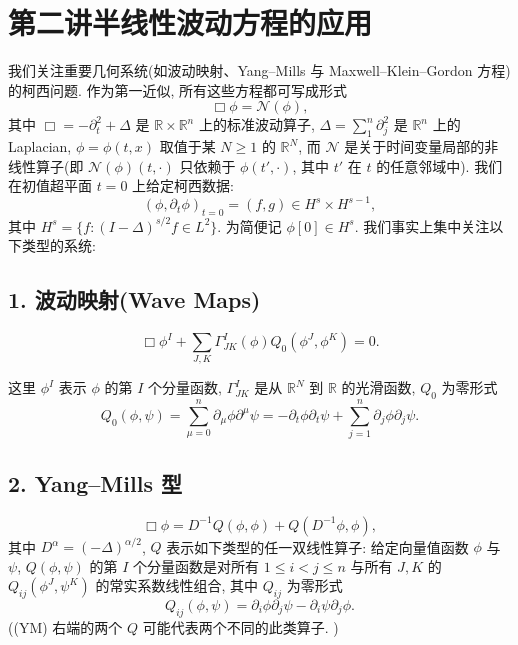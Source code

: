 \chapter{第二讲\quad 半线性波动方程的应用}

我们关注重要几何系统(如波动映射、Yang--Mills 与 Maxwell--Klein--Gordon 方程)的柯西问题. 作为第一近似, 所有这些方程都可写成形式
\begin{equation}
\Box\phi=\mathcal{N}(\phi),\end{equation}
其中 $\Box = -\partial_t^2 + \Delta$ 是 $\mathbb{R} \times \mathbb{R}^n$ 上的标准波动算子, $\Delta = \sum_1^n \partial_j^2$ 是 $\mathbb{R}^n$ 上的 Laplacian, $\phi = \phi(t, x)$ 取值于某 $N \geq 1$ 的 $\mathbb{R}^N$, 而 $\mathcal{N}$ 是关于时间变量局部的非线性算子(即 $\mathcal{N}(\phi)(t, \cdot)$ 只依赖于 $\phi(t', \cdot)$, 其中 $t'$ 在 $t$ 的任意邻域中).
我们在初值超平面 $t = 0$ 上给定柯西数据:
\begin{equation}
(\phi,\partial_{t}\phi)_{t=0}=(f,g)\in H^{s}\times H^{s-1},\end{equation}
其中 $H^s = \{f : (I - \Delta)^{s/2} f \in L^2\}$. 为简便记 $\phi[0] \in H^s$.
我们事实上集中关注以下类型的系统:
\section*{1. 波动映射(Wave Maps)}

\begin{equation}
\Box\phi^{I}+\sum_{J,K}\Gamma_{J K}^{I}(\phi)Q_{0}(\phi^{J},\phi^{K})=0.\end{equation}

这里 $\phi^{I}$ 表示 $\phi$ 的第 $I$ 个分量函数, $\Gamma_{JK}^{I}$ 是从 $\mathbb{R}^{N}$ 到 $\mathbb{R}$ 的光滑函数, $Q_{0}$ 为零形式
\[
Q_{0}(\phi,\psi)=\sum_{\mu=0}^{n}\partial_{\mu}\phi\partial^{\mu}\psi=-\partial_{t}\phi\partial_{t}\psi+\sum_{j=1}^{n}\partial_{j}\phi\partial_{j}\psi.
\]

\section*{2. Yang--Mills 型}

\begin{equation}
\Box\phi=D^{-1}Q(\phi,\phi)+Q(D^{-1}\phi,\phi),\end{equation}
其中 $D^\alpha = (-\Delta)^{\alpha/2}$, $Q$ 表示如下类型的任一双线性算子: 给定向量值函数 $\phi$ 与 $\psi$, $Q(\phi, \psi)$ 的第 $I$ 个分量函数是对所有 $1 \leq i < j \leq n$ 与所有 $J, K$ 的 $Q_{ij}(\phi^J, \psi^K)$ 的常实系数线性组合, 其中 $Q_{ij}$ 为零形式
\[
Q_{i j}(\phi,\psi)=\partial_{i}\phi\partial_{j}\psi-\partial_{i}\psi\partial_{j}\phi.
\]
((YM) 右端的两个 $Q$ 可能代表两个不同的此类算子. )

